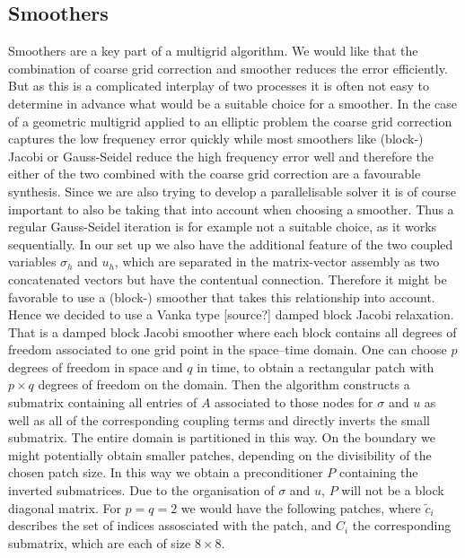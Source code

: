 \documentclass[../draft_1.tex]{subfiles}
\begin{document}
\FloatBarrier
\subsection{Smoothers}
Smoothers are a key part of a multigrid algorithm. We would like that the combination of coarse grid correction and smoother reduces the error efficiently. But as this is a complicated interplay of two processes it is often not easy to determine in advance what would be a suitable choice for a smoother. In the case of a geometric multigrid applied to an elliptic problem the coarse grid correction captures the low frequency error quickly while most smoothers like (block-) Jacobi or Gauss-Seidel reduce the high frequency error well and therefore the either of the two combined with the coarse grid correction are a favourable synthesis. Since we are also trying to develop a parallelisable solver it is of course important to also be taking that into account when choosing a smoother. Thus a regular Gauss-Seidel iteration is for example not a suitable choice, as it works sequentially. In our set up we also have the additional feature of the two coupled variables $\sigma_h$ and $u_h$, which are separated in the matrix-vector assembly as two concatenated vectors but have the contentual connection. Therefore it might be favorable to use a (block-) smoother that takes this relationship into account. Hence we decided to use a Vanka type [source?] damped block Jacobi relaxation. That is a damped block Jacobi smoother where each block contains all degrees of freedom associated to one grid point in the space--time domain. One can choose $p$ degrees of freedom in space and $q$ in time, to obtain a rectangular patch with $p \times q$ degrees of freedom on the domain. Then the algorithm constructs a submatrix containing all entries of $A$ associated to those nodes for $\sigma$ and $u$ as well as all of the corresponding coupling terms and directly inverts the small submatrix. The entire domain is partitioned in this way. On the boundary we might potentially obtain smaller patches, depending on the divisibility of the chosen patch size. In this way we obtain a preconditioner $P$ containing the inverted submatrices. Due to the organisation of $\sigma$ and $u$, $P$ will not be a block diagonal matrix. For $p = q = 2 $ we would have the following patches, where $\tilde{c}_i$ describes the set of indices assosciated with the patch, and $C_i$ the corresponding submatrix, which are each of size $8 \times 8$. 
\end{document}
